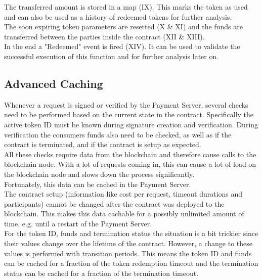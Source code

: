 \documentclass[a4paper,12pt]{scrartcl}
\begin{document}
The transferred amount is stored in a map (IX). This marks the token as used and can also be used as a history of redeemed tokens for further analysis.\\
The soon expiring token parameters are resetted (X \& XI) and the funds are transferred between the parties inside the contract (XII \& XIII).\\

In the end a "Redeemed" event is fired (XIV). It can be used to validate the successful execution of this function and for further analysis later on.

\subsection{Advanced Caching}

Whenever a request is signed or verified by the Payment Server, several checks need to be performed based on the current state in the contract. Specifically the active token ID must be known during signature creation and verification. During verification the consumers funds also need to be checked, as well as if the contract is terminated, and if the contract is setup as expected.\\

All these checks require data from the blockchain and therefore cause calls to the blockchain node. With a lot of requests coming in, this can cause a lot of load on the blockchain node and slows down the process significantly.\\

Fortunately, this data can be cached in the Payment Server.\\
The contract setup (information like cost per request, timeout durations and participants) cannot be changed after the contract was deployed to the blockchain. This makes this data cachable for a possibly unlimited amount of time, e.g. until a restart of the Payment Server.\\
For the token ID, funds and termination status the situation is a bit trickier since their values change over the lifetime of the contract. However, a change to these values is performed with transition periods. This means the token ID and funds can be cached for a fraction of the token redemption timeout and the termination status can be cached for a fraction of the termination timeout.\\
\end{document}
